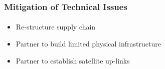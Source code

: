 \begin{frame}
  \frametitle{Mitigation of Technical Issues}
  \framesubtitle{}
  \begin{itemize}
    \item<1-> Re-structure supply chain

    \item<2-> Partner to build limited physical infrastructure

    \item<3-> Partner to establish satellite up-links

  \end{itemize}
\end{frame}
